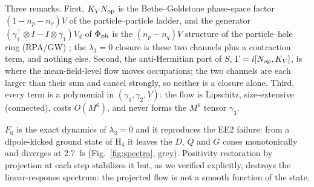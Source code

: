 \documentclass[aip,jcp,reprint,floatfix,superscriptaddress]{revtex4-2}
\begin{document}
Three remarks. First, $K_V N_{\rm op}$ is the Bethe--Goldstone phase-space factor $(1-n_p-n_v)V$ of the particle--particle ladder, and the generator $(\gamma_1^{\!\top}\!\otimes I-I\otimes\gamma_1)V_d$ of $\Phi_{\rm ph}$ is the $(n_p-n_q)V$ structure of the particle--hole ring (RPA/GW) \cite{fetter,ringschuck}; the $\lambda_3=0$ closure is these two channels plus a contraction term, and nothing else. Second, the anti-Hermitian part of $S$, $\Gamma=i[N_{\rm op},K_V]$, is where the mean-field-level flow moves occupations; the two channels are each larger than their sum and cancel strongly, so neither is a closure alone. Third, every term is a polynomial in $(\gamma_1,\gamma_2,V)$: the flow is Lipschitz, size-extensive (connected), costs $O(M^6)$, and never forms the $M^6$ tensor $\gamma_3$.

$F_0$ is the exact dynamics of $\lambda_3=0$ and it reproduces the EE2 failure: from a dipole-kicked ground state of H$_4$ it leaves the $D$, $Q$ and $G$ cones monotonically and diverges at 2.7~fs (Fig.~\ref{fig:spectra}, grey). Positivity restoration by projection at each step \cite{lackner2015,joost2022} stabilizes it but, as we verified explicitly, destroys the linear-response spectrum: the projected flow is not a smooth function of the state.
\end{document}
